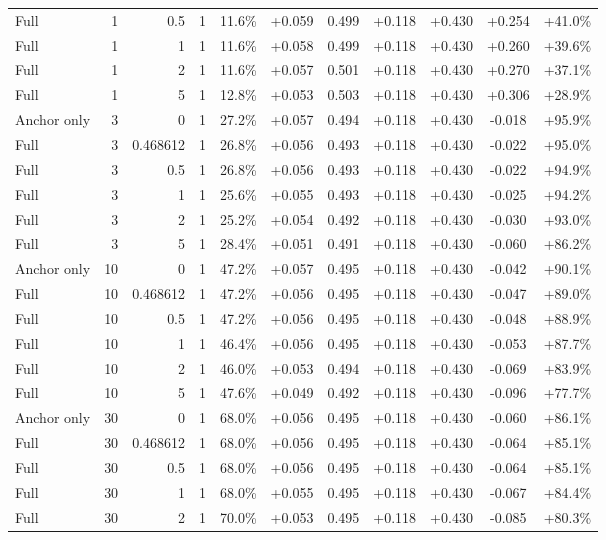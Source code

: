 \begin{table}[htbp]
\begin{tabular}{lrrrccccccc}
Full & 1 & 0.5 & 1 & 11.6\% & +0.059 & 0.499 & +0.118 & +0.430 & +0.254 & +41.0\% \\
Full & 1 & 1 & 1 & 11.6\% & +0.058 & 0.499 & +0.118 & +0.430 & +0.260 & +39.6\% \\
Full & 1 & 2 & 1 & 11.6\% & +0.057 & 0.501 & +0.118 & +0.430 & +0.270 & +37.1\% \\
Full & 1 & 5 & 1 & 12.8\% & +0.053 & 0.503 & +0.118 & +0.430 & +0.306 & +28.9\% \\
Anchor only & 3 & 0 & 1 & 27.2\% & +0.057 & 0.494 & +0.118 & +0.430 & -0.018 & +95.9\% \\
Full & 3 & 0.468612 & 1 & 26.8\% & +0.056 & 0.493 & +0.118 & +0.430 & -0.022 & +95.0\% \\
Full & 3 & 0.5 & 1 & 26.8\% & +0.056 & 0.493 & +0.118 & +0.430 & -0.022 & +94.9\% \\
Full & 3 & 1 & 1 & 25.6\% & +0.055 & 0.493 & +0.118 & +0.430 & -0.025 & +94.2\% \\
Full & 3 & 2 & 1 & 25.2\% & +0.054 & 0.492 & +0.118 & +0.430 & -0.030 & +93.0\% \\
Full & 3 & 5 & 1 & 28.4\% & +0.051 & 0.491 & +0.118 & +0.430 & -0.060 & +86.2\% \\
Anchor only & 10 & 0 & 1 & 47.2\% & +0.057 & 0.495 & +0.118 & +0.430 & -0.042 & +90.1\% \\
Full & 10 & 0.468612 & 1 & 47.2\% & +0.056 & 0.495 & +0.118 & +0.430 & -0.047 & +89.0\% \\
Full & 10 & 0.5 & 1 & 47.2\% & +0.056 & 0.495 & +0.118 & +0.430 & -0.048 & +88.9\% \\
Full & 10 & 1 & 1 & 46.4\% & +0.056 & 0.495 & +0.118 & +0.430 & -0.053 & +87.7\% \\
Full & 10 & 2 & 1 & 46.0\% & +0.053 & 0.494 & +0.118 & +0.430 & -0.069 & +83.9\% \\
Full & 10 & 5 & 1 & 47.6\% & +0.049 & 0.492 & +0.118 & +0.430 & -0.096 & +77.7\% \\
Anchor only & 30 & 0 & 1 & 68.0\% & +0.056 & 0.495 & +0.118 & +0.430 & -0.060 & +86.1\% \\
Full & 30 & 0.468612 & 1 & 68.0\% & +0.056 & 0.495 & +0.118 & +0.430 & -0.064 & +85.1\% \\
Full & 30 & 0.5 & 1 & 68.0\% & +0.056 & 0.495 & +0.118 & +0.430 & -0.064 & +85.1\% \\
Full & 30 & 1 & 1 & 68.0\% & +0.055 & 0.495 & +0.118 & +0.430 & -0.067 & +84.4\% \\
Full & 30 & 2 & 1 & 70.0\% & +0.053 & 0.495 & +0.118 & +0.430 & -0.085 & +80.3\% \\

\end{tabular}
\end{table}
